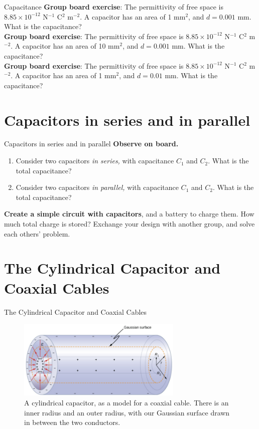 \documentclass{beamer}
\begin{document}
\begin{frame}{Capacitance}
\textbf{Group board exercise}: The permittivity of free space is $8.85 \times 10^{-12}$ N$^{-1}$ C$^2$ m$^{-2}$.  A capacitor has an area of 1 mm$^2$, and $d = 0.001$ mm.  What is the capacitance? \\ 
\textbf{Group board exercise}: The permittivity of free space is $8.85 \times 10^{-12}$ N$^{-1}$ C$^2$ m$^{-2}$.  A capacitor has an area of 10 mm$^2$, and $d = 0.001$ mm.  What is the capacitance? \\
\textbf{Group board exercise}: The permittivity of free space is $8.85 \times 10^{-12}$ N$^{-1}$ C$^2$ m$^{-2}$.  A capacitor has an area of 1 mm$^2$, and $d = 0.01$ mm.  What is the capacitance?
\end{frame}

\section{Capacitors in series and in parallel}

\begin{frame}{Capacitors in series and in parallel}
\textbf{Observe on board.}
\begin{enumerate}
\item Consider two capacitors \textit{in series,} with capacitance $C_1$ and $C_2$.  What is the total capacitance?
\item Consider two capacitors \textit{in parallel,} with capacitance $C_1$ and $C_2$.  What is the total capacitance?
\end{enumerate}
\textbf{Create a simple circuit with capacitors}, and a battery to charge them.  How much total charge is stored?  Exchange your design with another group, and solve each others' problem.
\end{frame}

\section{The Cylindrical Capacitor and Coaxial Cables}

\begin{frame}{The Cylindrical Capacitor and Coaxial Cables}
\begin{figure}
\centering
\includegraphics[width=0.7\textwidth]{figures/cyl.png}
\caption{\label{fig:cyl} A cylindrical capacitor, as a model for a coaxial cable.  There is an inner radius and an outer radius, with our Gaussian surface drawn in between the two conductors.}
\end{figure}
\end{frame}
\end{document}
